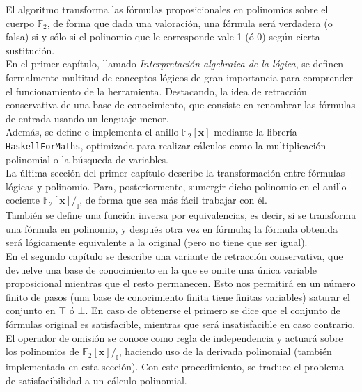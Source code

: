 El algoritmo transforma las fórmulas proposicionales en polinomios sobre el cuerpo $\mathbb{F}_2$, de forma que dada una valoración, una fórmula será verdadera (o falsa) si y sólo si el polinomio que le corresponde vale 1 (ó 0) según cierta sustitución. \\

En el primer capítulo, llamado \textit{Interpretación algebraica de la lógica}, se definen formalmente multitud de conceptos lógicos de gran importancia para comprender el funcionamiento de la herramienta. Destacando, la idea de retracción conservativa de una base de conocimiento, que consiste en renombrar las fórmulas de entrada usando un lenguaje menor.\\ 

Además, se define e implementa el anillo $\mathbb{F}_2[\textbf{x}]$ mediante la librería \texttt{HaskellForMaths}, optimizada para realizar cálculos como la multiplicación polinomial o la búsqueda de variables.\\ 

La última sección del primer capítulo describe la transformación entre fórmulas lógicas y polinomio. Para, posteriormente, sumergir dicho polinomio en el anillo cociente $\mathbb{F}_2[\textbf{x}] /_{\mathbb{I}}$, de forma que sea más fácil trabajar con él.\\

 También se define una función inversa por equivalencias, es decir, si se transforma una fórmula en polinomio, y después otra vez en fórmula; la fórmula obtenida será lógicamente equivalente a la original (pero no tiene que ser igual).\\

En el segundo capítulo se describe una variante de retracción conservativa, que devuelve una base de conocimiento en la que se omite una única variable proposicional mientras que el resto permanecen. Esto nos permitirá en un número finito de pasos (una base de conocimiento finita tiene finitas variables) saturar el conjunto en $\top$ ó $\bot$. En caso de obtenerse el primero se dice que el conjunto de fórmulas original es satisfacible, mientras que será insatisfacible en caso contrario.\\

El operador de omisión se conoce como regla de independencia y actuará sobre los polinomios de $\mathbb{F}_2[\textbf{x}] /_{\mathbb{I}}$, haciendo uso de la derivada polinomial (también implementada en esta sección). Con este procedimiento, se traduce el problema de satisfacibilidad a un cálculo polinomial.\\

